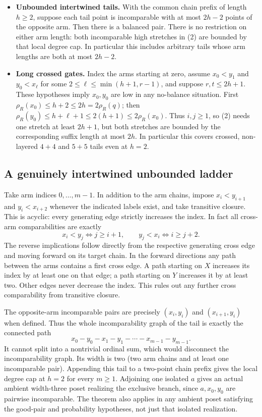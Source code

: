 \documentclass[
  11pt,
]{article}
\providecommand{\tightlist}{%
  \setlength{\itemsep}{0pt}\setlength{\parskip}{0pt}}
\begin{document}
\begin{itemize}
\tightlist
\item
  \textbf{Unbounded intertwined tails.} With the common chain prefix of
  length \(h\ge2\), suppose each tail point is incomparable with at most
  \(2h-2\) points of the opposite arm. Then there is a balanced pair.
  There is no restriction on either arm length: both incomparable high
  stretches in (2) are bounded by that local degree cap. In particular
  this includes arbitrary tails whose arm lengths are both at most
  \(2h-2\).
\item
  \textbf{Long crossed gates.} Index the arms starting at zero, assume
  \(x_0<y_1\) and \(y_0<x_\ell\) for some \(2\le\ell\le\min(h+1,r-1)\),
  and suppose \(r,t\le2h+1\). These hypotheses imply \(x_0,y_0\) are low
  in any no-balance situation. First
  \(\rho_R(x_0)\le h+2\le2h=2\rho_R(q)\); then
  \(\rho_R(y_0)\le h+\ell+1\le2(h+1)\le2\rho_R(x_0)\). Thus \(i,j\ge1\),
  so (2) needs one stretch at least \(2h+1\), but both stretches are
  bounded by the corresponding suffix length at most \(2h\). In
  particular this covers crossed, non-layered \(4+4\) and \(5+5\) tails
  even at \(h=2\).
\end{itemize}

\subsection{A genuinely intertwined unbounded
ladder}\label{a-genuinely-intertwined-unbounded-ladder}

Take arm indices \(0,\ldots,m-1\). In addition to the arm chains, impose
\(x_i<y_{i+1}\) and \(y_i<x_{i+2}\) whenever the indicated labels exist,
and take transitive closure. This is acyclic: every generating edge
strictly increases the index. In fact all cross-arm comparabilities are
exactly \[
 x_i<y_j\iff j\ge i+1,\qquad y_j<x_i\iff i\ge j+2.
\] The reverse implications follow directly from the respective
generating cross edge and moving forward on its target chain. In the
forward directions any path between the arms contains a first cross
edge. A path starting on \(X\) increases its index by at least one on
that edge; a path starting on \(Y\) increases it by at least two. Other
edges never decrease the index. This rules out any further cross
comparability from transitive closure.

The opposite-arm incomparable pairs are precisely \((x_i,y_i)\) and
\((x_{i+1},y_i)\) when defined. Thus the whole incomparability graph of
the tail is exactly the connected path \[
 x_0-y_0-x_1-y_1-\cdots-x_{m-1}-y_{m-1}.
\] It cannot split into a nontrivial ordinal sum, which would disconnect
the incomparability graph. Its width is two (two arm chains and at least
one incomparable pair). Appending this tail to a two-point chain prefix
gives the local degree cap at \(h=2\) for every \(m\ge1\). Adjoining one
isolated \(a\) gives an actual ambient width-three poset realizing the
exclusive branch, since \(a,x_0,y_0\) are pairwise incomparable. The
theorem also applies in any ambient poset satisfying the good-pair and
probability hypotheses, not just that isolated realization.
\end{document}
